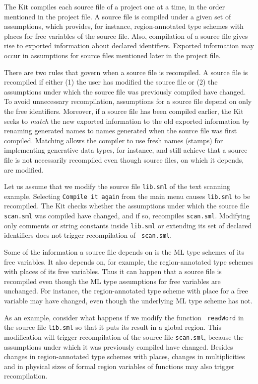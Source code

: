 \documentclass[12pt]{book}
\begin{document}
The Kit compiles each source file of a project one at a time, in the
order mentioned in the project file. A source file is compiled under
a given set of assumptions, which provides, for instance, region-annotated type
schemes with places for free variables of the source file. Also, compilation of a
source file gives rise to exported information about declared
identifiers. Exported information may occur in assumptions for source
files mentioned later in the project file.

There are two rules that govern when a source file is recompiled.  A
source file is recompiled if either (1) the user has modified the
source file or (2) the assumptions under which the source file was
previously compiled have changed. To avoid unnecessary recompilation,
assumptions for a source file depend on only the free identifiers.
Moreover, if a source file has been compiled earlier, the Kit seeks to
%
{\em match\/} the new exported information to the old exported
information by renaming generated names to names generated when the
source file was first compiled. Matching allows the compiler to use
fresh names (stamps) for implementing generative data types, for
instance, and still achieve that a source file is not necessarily
%
recompiled even though source files, on which it depends, are
modified.

Let us assume that we modify the source file {\tt lib.sml} of the text
scanning example.  Selecting {\tt Compile it again} from the main menu
causes {\tt lib.sml} to be recompiled.  The Kit checks whether the
assumptions under which the source file {\tt scan.sml} was compiled
have changed, and if so, recompiles {\tt scan.sml}.  Modifying only
comments or string constants inside {\tt lib.sml} or extending its set
of declared identifiers does not trigger recompilation of {\tt
  scan.sml}.

Some of the information a source file depends on is the ML type
schemes of its free variables. It also depends on, for example, the
region-annotated type schemes with places of its free variables.  Thus
it can happen that a source file is recompiled even though the ML type
assumptions for free variables are unchanged. For instance, the
region-annotated type scheme with place for a free variable may have
changed, even though the underlying ML type scheme has not.

As an example, consider what happens if we modify the function {\tt
  readWord} in the source file {\tt lib.sml} so that it puts its
result in a global region. This modification will trigger
recompilation of the source file {\tt scan.sml}, because the
assumptions under which it was previously compiled have changed.
Besides changes in region-annotated type schemes with places, changes
in multiplicities and in physical sizes of formal region variables of
functions may also trigger recompilation.
\end{document}
